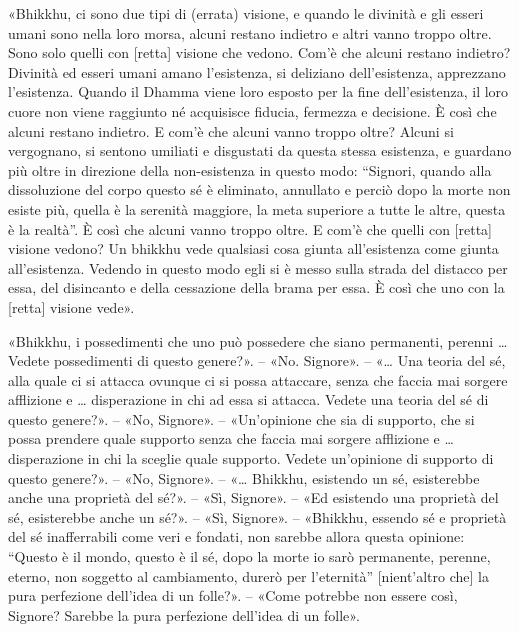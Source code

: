 
«Bhikkhu, ci sono due tipi di (errata) visione, e quando le divinità e gli
esseri umani sono nella loro morsa, alcuni restano indietro e altri vanno troppo
oltre. Sono solo quelli con [retta] visione che vedono. Com’è che alcuni restano
indietro? Divinità ed esseri umani amano l’esistenza, si deliziano
dell’esistenza, apprezzano l’esistenza. Quando il Dhamma viene loro esposto per
la fine dell’esistenza, il loro cuore non viene raggiunto né acquisisce fiducia,
fermezza e decisione. È così che alcuni restano indietro. E com’è che alcuni
vanno troppo oltre? Alcuni si vergognano, si sentono umiliati e disgustati da
questa stessa esistenza, e guardano più oltre in direzione della non-esistenza
in questo modo: “Signori, quando alla dissoluzione del corpo questo sé è
eliminato, annullato e perciò dopo la morte non esiste più, quella è la serenità
maggiore, la meta superiore a tutte le altre, questa è la realtà”. È così che
alcuni vanno troppo oltre. E com’è che quelli con [retta] visione vedono? Un
bhikkhu vede qualsiasi cosa giunta all’esistenza come giunta all’esistenza.
Vedendo in questo modo egli si è messo sulla strada del distacco per essa, del
disincanto e della cessazione della brama per essa. È così che uno con la
[retta] visione vede».


«Bhikkhu, i possedimenti che uno può possedere che siano permanenti, perenni …
Vedete possedimenti di questo genere?». – «No. Signore». – «… Una teoria del sé,
alla quale ci si attacca ovunque ci si possa attaccare, senza che faccia mai
sorgere afflizione e … disperazione in chi ad essa si attacca. Vedete una teoria
del sé di questo genere?». – «No, Signore». – «Un’opinione che sia di supporto,
che si possa prendere quale supporto senza che faccia mai sorgere afflizione e …
disperazione in chi la sceglie quale supporto. Vedete un’opinione di supporto di
questo genere?». – «No, Signore». – «… Bhikkhu, esistendo un sé, esisterebbe
anche una proprietà del sé?». – «Sì, Signore». – «Ed esistendo una proprietà del
sé, esisterebbe anche un sé?». – «Sì, Signore». – «Bhikkhu, essendo sé e
proprietà del sé inafferrabili come veri e fondati, non sarebbe allora questa
opinione: “Questo è il mondo, questo è il sé, dopo la morte io sarò permanente,
perenne, eterno, non soggetto al cambiamento, durerò per l’eternità”
[nient’altro che] la pura perfezione dell’idea di un folle?». – «Come potrebbe
non essere così, Signore? Sarebbe la pura perfezione dell’idea di un folle».


